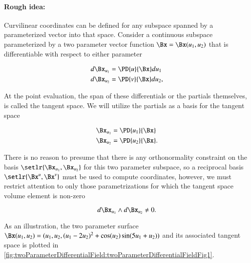 %
%
\paragraph{Rough idea:}
Curvilinear coordinates can be defined for any subspace spanned by a parameterized vector into that space.
Consider a continuous subspace parameterized by a two parameter vector function \( \Bx = \Bx(u_1, u_2) \) that is differentiable with respect to either parameter

\begin{dmath}\label{eqn:curvilinearDefined:40}
\begin{aligned}
d\Bx_{u_1} &= \PD{u}{\Bx} du_1 \\
d\Bx_{u_2} &= \PD{v}{\Bx} du_2,
\end{aligned}
\end{dmath}

At the point evaluation,
the span of these differentials or the partials themselves,
 is called the tangent space.
We will utilize the partials as a basis for the tangent space

\begin{dmath}\label{eqn:curvilinearDefined:80}
\begin{aligned}
\Bx_{u_1} &= \PD{u_1}{\Bx} \\
\Bx_{u_2} &= \PD{u_2}{\Bx}.
\end{aligned}
\end{dmath}

There is no reason to presume that there is any orthonormality constraint on the basis \( \setlr{ \Bx_{u_1}, \Bx_{u_2} } \) for this two parameter subspace, so a reciprocal basis \( \setlr{ \Bx^u, \Bx^v } \)
must be used to compute coordinates, however,
we must restrict attention to only those parametrizations for which the tangent space volume element is non-zero

\begin{dmath}\label{eqn:curvilinearDefined:60}
d\Bx_{u_1} \wedge d\Bx_{u_2} \ne 0.
\end{dmath}

As an illustration, the two parameter surface \( \Bx(u_1, u_2) = (u_1, u_2, (u_1 - 2 u_2)^2 + \cos(u_2) \sin(5 u_1 + u_2)) \)
and its associated tangent space is plotted in
\cref{fig:twoParameterDifferentialField:twoParameterDifferentialFieldFig1}.

